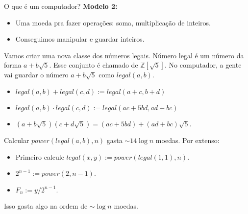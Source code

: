 \documentclass[aspectratio=169, handout]{beamer}
\begin{document}
\begin{frame}
	
	O que é um computador? \textbf{Modelo 2:}
	\begin{itemize}
		\item Uma moeda pra fazer operações: soma, multiplicação de inteiros.
		\item Conseguimos manipular e guardar inteiros.
	\end{itemize}

	Vamos criar uma nova classe dos números legais. Número legal é um número da forma $a + b\sqrt{5}$. Esse conjunto é chamado de $\mathbb{Z}[\sqrt{5}]$. No computador, a gente vai guardar o número $a + b\sqrt{5}$ como  $legal(a, b)$.

	\begin{itemize}
		\item $legal(a, b) + legal(c, d) := legal(a + c, b + d)$
		\item $legal(a, b) \cdot legal(c, d) := legal(ac + 5bd, ad + bc)$
		\item $(a + b\sqrt5)(c + d\sqrt5) = (ac + 5bd) + (ad + bc)\sqrt{5}$.
	\end{itemize}

	Calcular $power(legal(a, b), n)$ gasta $\sim 14\log n$ moedas. Por extenso:
	\begin{itemize}
		\item Primeiro calcule $legal(x, y) := power(legal(1, 1), n)$.
		\item $2^{n-1} := power(2, n-1)$.
		\item $F_n := y/2^{n-1}$.
	\end{itemize}
	Isso gasta algo na ordem de $\sim \log n$ moedas.
\end{frame}
\end{document}
